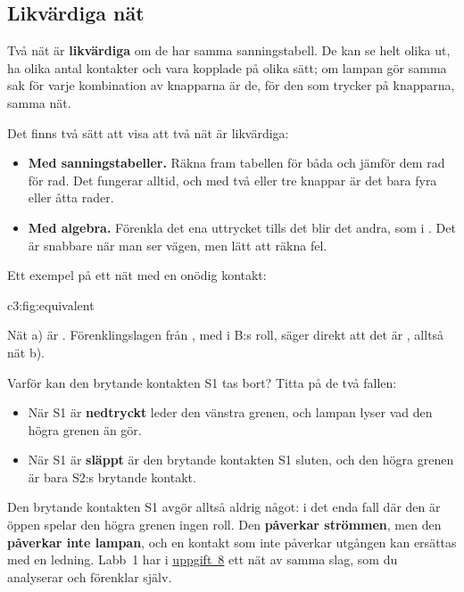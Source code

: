 \subsection{Likvärdiga nät}
\label{c3:a3}
Två nät är \textbf{likvärdiga} om de har samma sanningstabell. De kan se helt olika ut, ha olika
antal kontakter och vara kopplade på olika sätt; om lampan gör samma sak för varje kombination av
knapparna är de, för den som trycker på knapparna, samma nät.

Det finns två sätt att visa att två nät är likvärdiga:
\begin{itemize}
  \item \textbf{Med sanningstabeller.} Räkna fram tabellen för båda och jämför dem rad för rad. Det
    fungerar alltid, och med två eller tre knappar är det bara fyra eller åtta rader.
  \item \textbf{Med algebra.} Förenkla det ena uttrycket tills det blir det andra, som i
    . Det är snabbare när man ser vägen, men lätt att räkna fel.
\end{itemize}

Ett exempel på ett nät med en onödig kontakt:

  {c3:fig:equivalent}

Nät a) är . Förenklingslagen från ,  med
 i B:s roll, säger direkt att det är , alltså nät b).

Varför kan den brytande kontakten S1 tas bort? Titta på de två fallen:
\begin{itemize}
  \item När S1 är \textbf{nedtryckt} leder den vänstra grenen, och lampan lyser vad den högra grenen
    än gör.
  \item När S1 är \textbf{släppt} är den brytande kontakten S1 sluten, och den högra grenen är bara
    S2:s brytande kontakt.
\end{itemize}

Den brytande kontakten S1 avgör alltså aldrig något: i det enda fall där den är öppen spelar den
högra grenen ingen roll. Den \textbf{påverkar strömmen}, men den \textbf{påverkar inte lampan}, och
en kontakt som inte påverkar utgången kan ersättas med en ledning. Labb~1 har i
\hyperref[lab1:u8]{uppgift~8} ett nät av samma slag, som du analyserar och förenklar själv.

